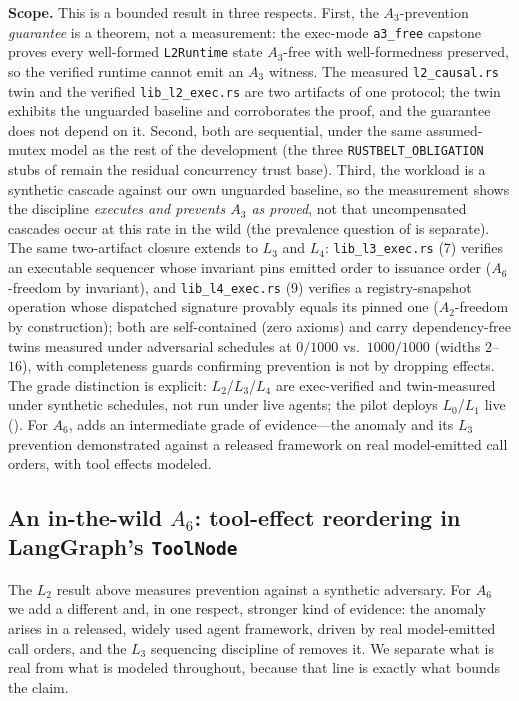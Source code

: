 \documentclass[journal,compsoc,10pt]{IEEEtran}
\theoremstyle{definition}
\theoremstyle{remark}
\begin{document}
\medskip
\noindent\textbf{Scope.}
This is a bounded result in three respects. First, the $A_3$-prevention
\emph{guarantee} is a theorem, not a measurement: the exec-mode
\texttt{a3\_free} capstone proves every well-formed \texttt{L2Runtime} state
$A_3$-free with well-formedness preserved, so the verified runtime cannot
emit an $A_3$ witness. The measured \texttt{l2\_causal.rs} twin and the
verified \texttt{lib\_l2\_exec.rs} are two artifacts of one protocol; the
twin exhibits the unguarded baseline and corroborates the proof, and the
guarantee does not depend on it. Second, both are sequential, under the
same assumed-mutex model as the rest of the development (the three
\texttt{RUSTBELT\_OBLIGATION} stubs of  remain
the residual concurrency trust base). Third, the workload is a synthetic
cascade against our own unguarded baseline, so the measurement shows the
discipline \emph{executes and prevents $A_3$ as proved}, not that
uncompensated cascades occur at this rate in the wild (the prevalence
question of  is separate). The same two-artifact
closure extends to $L_3$ and $L_4$: \texttt{lib\_l3\_exec.rs} (7) verifies
an executable sequencer whose invariant pins emitted order to issuance
order ($A_6$-freedom by invariant), and \texttt{lib\_l4\_exec.rs} (9)
verifies a registry-snapshot operation whose dispatched signature provably
equals its pinned one ($A_2$-freedom by construction); both are
self-contained (zero axioms) and carry dependency-free twins measured under
adversarial schedules at $0/1000$ vs.\ $1000/1000$ (widths $2$--$16$), with
completeness guards confirming prevention is not by dropping effects. The
grade distinction is explicit: $L_2$/$L_3$/$L_4$ are exec-verified and
twin-measured under synthetic schedules, not run under live agents; the
pilot deploys $L_0$/$L_1$ live (). For $A_6$,
 adds an intermediate grade of evidence---the anomaly
and its $L_3$ prevention demonstrated against a released framework on real
model-emitted call orders, with tool effects modeled.

\subsection{An in-the-wild $A_6$: tool-effect reordering in LangGraph's \texttt{ToolNode}}
\label{sec:langgraph-a6}
The $L_2$ result above measures prevention against a synthetic adversary. For
$A_6$ we add a different and, in one respect, stronger kind of evidence: the
anomaly arises in a released, widely used agent framework, driven by real
model-emitted call orders, and the $L_3$ sequencing discipline of
 removes it. We separate what is real from what is modeled
throughout, because that line is exactly what bounds the claim.
\end{document}
